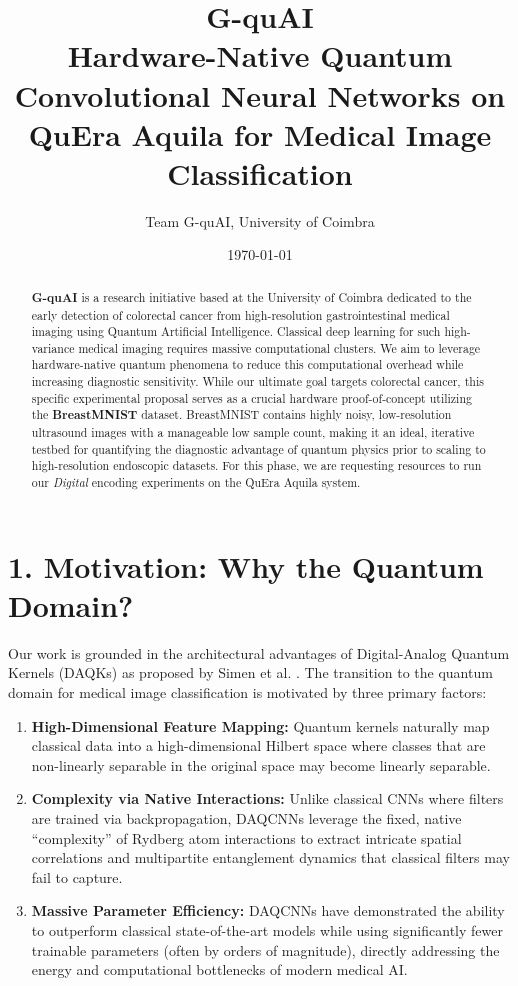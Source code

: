 \documentclass[11pt,a4paper]{article}
\title{G-quAI \\ \large Hardware-Native Quantum Convolutional Neural Networks on QuEra Aquila for Medical Image Classification}
\author{Team G-quAI, University of Coimbra}
\date{\today}
\begin{document}
\maketitle

\begin{abstract}
\textbf{G-quAI} is a research initiative based at the University of Coimbra dedicated to the early detection of colorectal cancer from high-resolution gastrointestinal medical imaging using Quantum Artificial Intelligence. Classical deep learning for such high-variance medical imaging requires massive computational clusters. We aim to leverage hardware-native quantum phenomena to reduce this computational overhead while increasing diagnostic sensitivity. While our ultimate goal targets colorectal cancer, this specific experimental proposal serves as a crucial hardware proof-of-concept utilizing the \textbf{BreastMNIST} dataset. BreastMNIST contains highly noisy, low-resolution ultrasound images with a manageable low sample count, making it an ideal, iterative testbed for quantifying the diagnostic advantage of quantum physics prior to scaling to high-resolution endoscopic datasets. For this phase, we are requesting resources to run our \textit{Digital} encoding experiments on the QuEra Aquila system.
\end{abstract}

\section*{1. Motivation: Why the Quantum Domain?}
Our work is grounded in the architectural advantages of Digital-Analog Quantum Kernels (DAQKs) as proposed by Simen et al. \cite{daqcnn2024}. The transition to the quantum domain for medical image classification is motivated by three primary factors:
\begin{enumerate}
    \item \textbf{High-Dimensional Feature Mapping:} Quantum kernels naturally map classical data into a high-dimensional Hilbert space where classes that are non-linearly separable in the original space may become linearly separable.
    \item \textbf{Complexity via Native Interactions:} Unlike classical CNNs where filters are trained via backpropagation, DAQCNNs leverage the fixed, native ``complexity'' of Rydberg atom interactions to extract intricate spatial correlations and multipartite entanglement dynamics that classical filters may fail to capture.
    \item \textbf{Massive Parameter Efficiency:} DAQCNNs have demonstrated the ability to outperform classical state-of-the-art models while using significantly fewer trainable parameters (often by orders of magnitude), directly addressing the energy and computational bottlenecks of modern medical AI.
\end{enumerate}
\end{document}
